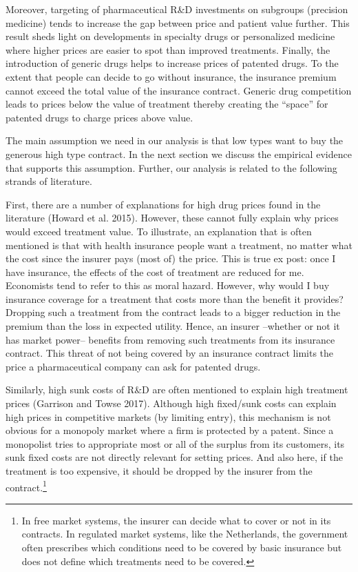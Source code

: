 \documentclass[a4paper,12pt]{article}
\makeatletter
\newcommand{\citeprocitem}[2]{\hyper@linkstart{cite}{citeproc_bib_item_#1}#2\hyper@linkend}
\makeatother
\begin{document}
Moreover, targeting of pharmaceutical R\&D investments on subgroups (precision medicine) tends to increase the gap between price and patient value further. This result sheds light on developments in specialty drugs or personalized medicine where higher prices are easier to spot than improved treatments. Finally, the introduction of generic drugs helps to increase prices of patented drugs. To the extent that people can decide to go without insurance, the insurance premium cannot exceed the total value of the insurance contract. Generic drug competition leads to prices below the value of treatment thereby creating the ``space'' for patented drugs to charge prices above value.

The main assumption we need in our analysis is that low types want to buy the generous high type contract. In the next section we discuss the empirical evidence that supports this assumption. Further, our analysis is related to the following strands of literature. 

First, there are a number of explanations for high drug prices found in the literature (\citeprocitem{23}{Howard et al. 2015}). However,  these cannot fully explain why prices would exceed treatment value. To illustrate, an explanation that is often mentioned is that with health insurance people want a treatment, no matter what the cost since the insurer pays (most of) the price. This is true ex post: once I have insurance, the effects of the cost of treatment are reduced for me. Economists tend to refer to this as moral hazard. However, why would I buy insurance coverage for a treatment that costs more than the benefit it provides? Dropping such a treatment from the contract leads to a bigger reduction in the premium than the loss in expected utility. Hence, an insurer --whether or not it has market power-- benefits from removing such treatments from its insurance contract. This threat of not being covered by an insurance contract limits the price a pharmaceutical company can ask for patented drugs.

Similarly, high sunk costs of R\&D are often mentioned to explain high treatment prices (\citeprocitem{17}{Garrison and Towse 2017}). Although high fixed/sunk costs can explain high prices in competitive markets (by limiting entry), this mechanism is not obvious for a monopoly market where a firm is protected by a patent. Since a monopolist tries to appropriate most or all of the surplus from its customers, its sunk fixed costs are not directly relevant for setting prices. And also here, if the treatment is too expensive, it should be dropped by the insurer from the contract.\footnote{In free market systems, the insurer can decide what to cover or not in its contracts. In regulated market systems, like the Netherlands, the government often prescribes which conditions need to be covered by basic insurance but does not define which treatments need to be covered.}
\end{document}
